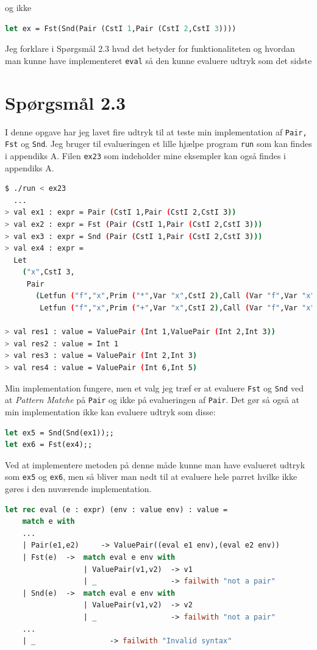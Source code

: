 \documentclass[danish,a4paper]{report}
\begin{document}
og ikke

\begin{lstlisting}[language=ML]
let ex = Fst(Snd(Pair (CstI 1,Pair (CstI 2,CstI 3))))
\end{lstlisting}

Jeg forklare i Spørgsmål 2.3 hvad det betyder for funktionaliteten og hvordan man kunne have implementeret \texttt{eval} så den kunne evaluere udtryk som det sidste 

\section*{Spørgsmål 2.3}

I denne opgave har jeg lavet fire udtryk til at teste min implementation af \texttt{Pair, Fst} og \texttt{Snd}. Jeg bruger til evalueringen et lille hjælpe program \texttt{run} som kan findes i appendiks A. Filen \texttt{ex23} som indeholder mine eksempler kan også findes i appendiks A.

\begin{lstlisting}[language=bash]
$ ./run < ex23
  ...
> val ex1 : expr = Pair (CstI 1,Pair (CstI 2,CstI 3))
> val ex2 : expr = Fst (Pair (CstI 1,Pair (CstI 2,CstI 3)))
> val ex3 : expr = Snd (Pair (CstI 1,Pair (CstI 2,CstI 3)))
> val ex4 : expr =
  Let
    ("x",CstI 3,
     Pair
       (Letfun ("f","x",Prim ("*",Var "x",CstI 2),Call (Var "f",Var "x")),
        Letfun ("f","x",Prim ("+",Var "x",CstI 2),Call (Var "f",Var "x"))))

> val res1 : value = ValuePair (Int 1,ValuePair (Int 2,Int 3))
> val res2 : value = Int 1
> val res3 : value = ValuePair (Int 2,Int 3)
> val res4 : value = ValuePair (Int 6,Int 5)
\end{lstlisting}

Min implementation fungere, men et valg jeg træf er at evaluere \texttt{Fst} og \texttt{Snd} ved at \textit{Pattern Matche} på \texttt{Pair} og ikke på evalueringen af \texttt{Pair}. Det gør så også at min implementation ikke kan evaluere udtryk som disse:

\begin{lstlisting}[language=ML]
let ex5 = Snd(Snd(ex1));;
let ex6 = Fst(ex4);;
\end{lstlisting}

Ved at implementere metoden på denne måde kunne man have evalueret udtryk som \texttt{ex5} og \texttt{ex6}, men så bliver man nødt til at evaluere hele parret hvilke ikke gøres i den nuværende implementation.

\begin{lstlisting}[language=ML]
let rec eval (e : expr) (env : value env) : value =
    match e with
    ...
    | Pair(e1,e2)     -> ValuePair((eval e1 env),(eval e2 env)) 
    | Fst(e)  ->  match eval e env with
                  | ValuePair(v1,v2)  -> v1
                  | _                 -> failwith "not a pair"
    | Snd(e)  ->  match eval e env with
                  | ValuePair(v1,v2)  -> v2
                  | _                 -> failwith "not a pair" 
    ...
    | _                 -> failwith "Invalid syntax"
\end{lstlisting}
\end{document}

